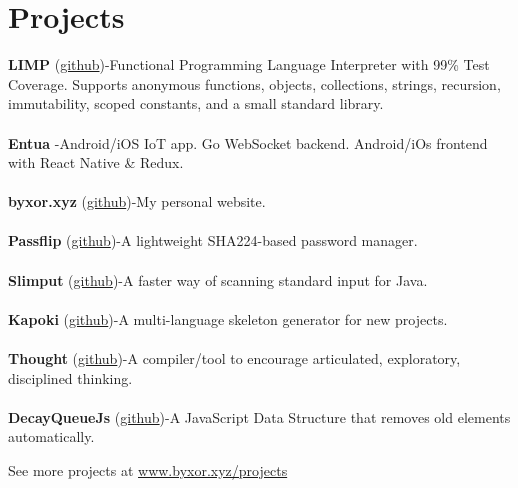 \documentclass{article}
\begin{document}
\section{Projects}
\begin{multicols}{2}
{\textbf{LIMP} (\href{http://www.github.com/byxor/limp}{github})\hspace{1.5em}-\hspace{1.5em}Functional Programming Language Interpreter with 99\% Test Coverage. Supports anonymous functions, objects, collections, strings, recursion, immutability, scoped constants, and a small standard library.}\\\\{\textbf{Entua} \hspace{1.5em}-\hspace{1.5em}Android/iOS IoT app. Go WebSocket backend. Android/iOs frontend with React Native \& Redux. }\\\\{\textbf{byxor.xyz} (\href{http://www.github.com/byxor/website}{github})\hspace{1.5em}-\hspace{1.5em}My personal website.}\\\\{\textbf{Passflip} (\href{http://www.github.com/byxor/passflip}{github})\hspace{1.5em}-\hspace{1.5em}A lightweight SHA224-based password manager.}\\\\{\textbf{Slimput} (\href{http://www.github.com/byxor/slimput}{github})\hspace{1.5em}-\hspace{1.5em}A faster way of scanning standard input for Java.}\\\\{\textbf{Kapoki} (\href{http://www.github.com/byxor/kapoki}{github})\hspace{1.5em}-\hspace{1.5em}A multi-language skeleton generator for new projects.}\\\\{\textbf{Thought} (\href{http://www.github.com/byxor/thought}{github})\hspace{1.5em}-\hspace{1.5em}A compiler/tool to encourage articulated, exploratory, disciplined thinking.}\\\\{\textbf{DecayQueueJs} (\href{http://www.github.com/byxor/DecayQueueJs}{github})\hspace{1.5em}-\hspace{1.5em}A JavaScript Data Structure that removes old elements automatically.}\\
\end{multicols}
\begin{center}
 See more projects at \url{www.byxor.xyz/projects}
\end{center}
\end{document}
